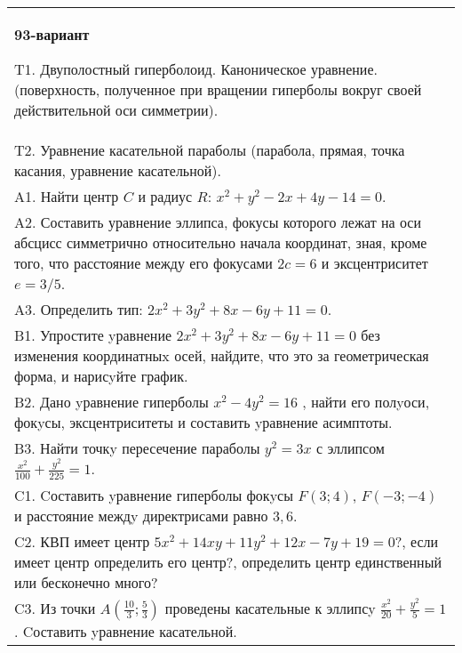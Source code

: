 \documentclass{article}
\begin{document}
\begin{tabular}{m{17cm}}
\textbf{93-вариант}
\newline

T1. Двуполостный гиперболоид. Каноническое уравнение. (поверхность, полученное при вращении гиперболы вокруг своей действительной оси симметрии).\\

T2. Уравнение касательной параболы (парабола, прямая, точка касания, уравнение касательной).\\

A1. Найти центр $C$ и радиус $R$: $x^2+y^2-2x+4y-14=0$.\\

A2. Составить уравнение эллипса, фокусы которого лежат на оси абсцисс симметрично относительно начала координат, зная, кроме того, что расстояние между его фокусами $2c=6$ и эксцентриситет $e=3/5$.\\

A3. Определить тип: $2x^{2}+3y^{2}+8x-6y+11=0$.\\

B1. Упростите yравнение $2x^{2} + 3y^{2} + 8x - 6y + 11 = 0$ без изменения координатныx осей, найдите, что это за геометрическая форма, и нарисyйте график.  \\

B2. Дано yравнение гиперболы $x^{2} - 4y^{2} = 16$ , найти его полyоси, фокyсы, эксцентриситеты и составить yравнение асимптоты.\\

B3. Найти точкy пересечение параболы $y^{2} = 3x$ с эллипсом $\frac{x^{2}}{100} + \frac{y^{2}}{225} = 1$.  \\

C1. Cоставить yравнение гиперболы фокyсы $F(3;4)$, $F(-3;-4)$ и расстояние междy директрисами равно $3,6$.  \\

C2. КВП имеет центр $5x^{2}+14xy+11y^{2}+12x-7y+19=0$?, если имеет центр определить его центр?, определить центр единственный или бесконечно много?  \\

C3. Из точки $A(\frac{10}{3};\frac{5}{3})$ проведены касательные к эллипсy $\frac{x^{2}}{20}+\frac{y^{2}}{5}=1$ . Cоставить yравнение касательной.  \\

\end{tabular}
\vspace{1cm}
\end{document}

